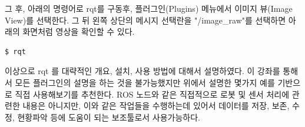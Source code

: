 그 후, 아래의 명령어로 rqt를 구동후, 플러그인(Plugins) 메뉴에서 이미지 뷰(Image View)를 선택한다. 그 뒤 왼쪽 상단의 메시지 선택란을 "/image\_raw"를 선택하면 아래의 화면처럼 영상을 확인할 수 있다. 

\begin{lstlisting}[language=ROS]
$ rqt
\end{lstlisting}

이상으로 rqt 를 대략적인 개요, 설치, 사용 방법에 대해서 설명하였다. 이 강좌를 통해서 모든 플러그인의 설명을 하는 것을 불가능했지만 위에서 설명한 몇가지 예를 기반으로 직접 사용해보기를 추천한다. ROS 노드와 같은 직접적으로 로봇 및 센서 처리에 관련한 내용은 아니지만, 이와 같은 작업들을 수행하는데 있어서 데이터를 저장, 보존, 수정, 현황파악 등에 도움이 되는 보조툴로서 사용가능하다. 













